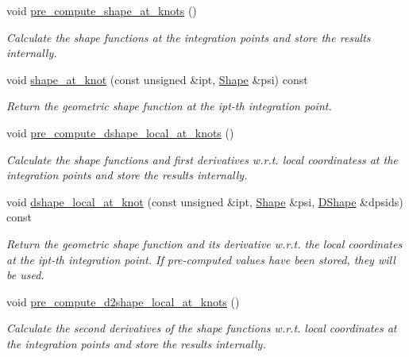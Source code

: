 \begin{DoxyCompactItemize}
void \hyperlink{classoomph_1_1StorableShapeElementBase_ad6900d26b449b3c58cba23bb58c631a7}{pre\+\_\+compute\+\_\+shape\+\_\+at\+\_\+knots} ()
\begin{DoxyCompactList}\small\item\em Calculate the shape functions at the integration points and store the results internally. \end{DoxyCompactList}\item 
void \hyperlink{classoomph_1_1StorableShapeElementBase_a162150b9480132ac350404291281eb3b}{shape\+\_\+at\+\_\+knot} (const unsigned \&ipt, \hyperlink{classoomph_1_1Shape}{Shape} \&psi) const
\begin{DoxyCompactList}\small\item\em Return the geometric shape function at the ipt-\/th integration point. \end{DoxyCompactList}\item 
void \hyperlink{classoomph_1_1StorableShapeElementBase_abbf221cfb9427bfc9af29233ef228b48}{pre\+\_\+compute\+\_\+dshape\+\_\+local\+\_\+at\+\_\+knots} ()
\begin{DoxyCompactList}\small\item\em Calculate the shape functions and first derivatives w.\+r.\+t. local coordinatess at the integration points and store the results internally. \end{DoxyCompactList}\item 
void \hyperlink{classoomph_1_1StorableShapeElementBase_a94e5818f75717febe8af072351543811}{dshape\+\_\+local\+\_\+at\+\_\+knot} (const unsigned \&ipt, \hyperlink{classoomph_1_1Shape}{Shape} \&psi, \hyperlink{classoomph_1_1DShape}{D\+Shape} \&dpsids) const
\begin{DoxyCompactList}\small\item\em Return the geometric shape function and its derivative w.\+r.\+t. the local coordinates at the ipt-\/th integration point. If pre-\/computed values have been stored, they will be used. \end{DoxyCompactList}\item 
void \hyperlink{classoomph_1_1StorableShapeElementBase_ae710e91d98baf5b83b0ee2557cbd2b3f}{pre\+\_\+compute\+\_\+d2shape\+\_\+local\+\_\+at\+\_\+knots} ()
\begin{DoxyCompactList}\small\item\em Calculate the second derivatives of the shape functions w.\+r.\+t. local coordinates at the integration points and store the results internally. \end{DoxyCompactList}\item 

\end{DoxyCompactItemize}
